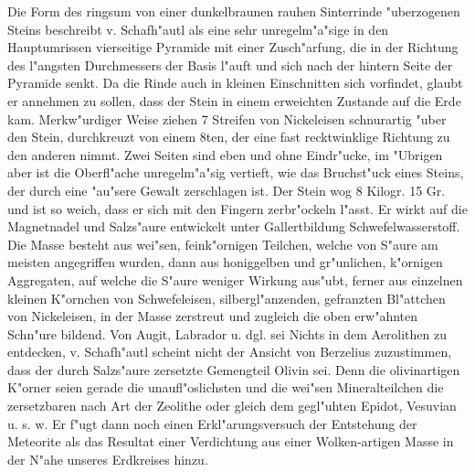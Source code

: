 \documentclass[a4paper, 11pt, oneside]{article}
\begin{document}
Die Form des ringsum von einer dunkelbraunen rauhen Sinterrinde "uberzogenen Steins beschreibt v. Schafh"autl als eine sehr unregelm"a"sige in den Hauptumrissen vierseitige Pyramide mit einer Zusch"arfung, die in der Richtung des l"angsten Durchmessers der Basis l"auft und sich nach der hintern Seite der Pyramide senkt. Da die Rinde auch in kleinen Einschnitten sich vorfindet, glaubt er annehmen zu sollen, dass der Stein in einem erweichten Zustande auf die Erde kam. Merkw"urdiger Weise ziehen 7 Streifen von Nickeleisen schnurartig "uber den Stein, durchkreuzt von einem 8ten, der eine fast recktwinklige Richtung zu den anderen nimmt. Zwei Seiten sind eben und ohne Eindr"ucke, im "Ubrigen aber ist die Oberfl"ache unregelm"a"sig vertieft, wie das Bruchst"uck eines Steins, der durch eine "au"sere Gewalt zerschlagen ist. Der Stein wog 8 Kilogr. 15 Gr. und ist so weich, dass er sich mit den Fingern zerbr"ockeln l"asst. Er wirkt auf die Magnetnadel und Salzs"aure entwickelt unter Gallertbildung Schwefelwasserstoff. Die Masse besteht aus wei"sen, feink"ornigen Teilchen, welche von S"aure am meisten angegriffen wurden, dann aus honiggelben und gr"unlichen, k"ornigen Aggregaten, auf welche die S"aure weniger Wirkung aus"ubt, ferner aus einzelnen kleinen K"ornchen von Schwefeleisen, silbergl"anzenden, gefranzten Bl"attchen von Nickeleisen, in der Masse zerstreut und zugleich die oben erw"ahnten Schn"ure bildend. Von Augit, Labrador u. dgl. sei Nichts in dem Aerolithen zu entdecken, v. Schafh"autl scheint nicht der Ansicht von Berzelius zuzustimmen, dass der durch Salzs"aure zersetzte Gemengteil Olivin sei. Denn die olivinartigen K"orner seien gerade die unaufl"oslichsten und die wei"sen Mineralteilchen die zersetzbaren nach Art der Zeolithe oder gleich dem gegl"uhten Epidot, Vesuvian u. s. w. Er f"ugt dann noch einen Erkl"arungsversuch der Entstehung der Meteorite als das Resultat einer Verdichtung aus einer Wolken-artigen Masse in der N"ahe unseres Erdkreises hinzu.
\end{document}

